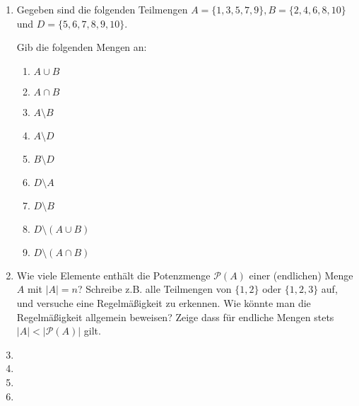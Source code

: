\documentclass[../main.tex]{subfiles}
\begin{document}
\begin{enumerate}
	\item Gegeben sind die folgenden Teilmengen \(A = \{ 1, 3, 5, 7, 9 \}, B = \{2, 4, 6, 8, 10 \} \) und
	      \(D = \{ 5,6,7,8,9,10\} \).

	      Gib die folgenden Mengen an:
	      \begin{enumerate}
		      \item \(A \cup B \)
		      \item \(A \cap B \)
		      \item \(A \setminus B \)
		      \item \(A \setminus D \)
		      \item \(B \setminus D \)
		      \item \(D \setminus A \)
		      \item \(D \setminus B \)
		      \item \(D \setminus(A \cup B) \)
		      \item \(D \setminus(A \cap B) \)
	      \end{enumerate}
	\item Wie viele Elemente enthält die Potenzmenge \( \mathcal{P}(A) \) einer (endlichen)
	      Menge \(A \) mit \( |A| = n \)? Schreibe z.B. alle Teilmengen von \( \{1,2\} \) oder
	      \( \{1,2,3\} \) auf, und versuche eine Regelmäßigkeit zu erkennen.
	      Wie könnte man die Regelmäßigkeit allgemein beweisen?
	      Zeige dass für endliche Mengen stets \( |A| < |\mathcal{P}(A)| \) gilt.
	\item
	\item
	\item
	\item
\end{enumerate}
\end{document}

